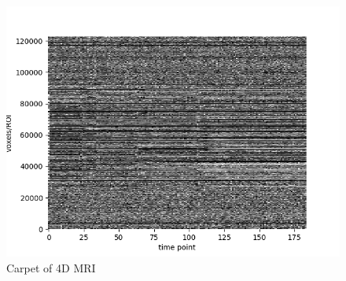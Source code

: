 \documentclass[]{report}
\begin{document}
\begin{figure}[h!]
\centering
\includegraphics[scale=0.6]{carpet.png}
\caption{Carpet of 4D MRI}
\label{fig:carpet}
\end{figure}
\end{document}
